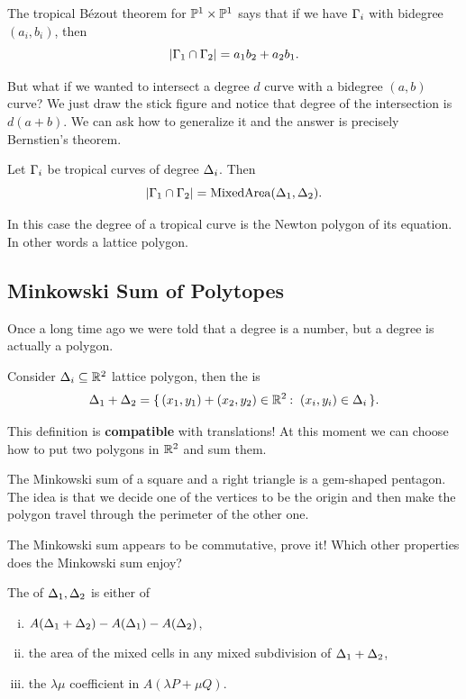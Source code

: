 \documentclass[12pt]{memoir}
\theoremstyle{definition}
\def\la{\lambda}
\begin{document}
The tropical Bézout theorem for $\mathbb{P}^1\times\mathbb{P}^1$ says that if we have $\Gamma_i$ with bidegree $(a_i,b_i)$, then 
$$|\Gamma_1\cap\Gamma_2|=a_1b_2+a_2b_1.$$

But what if we wanted to intersect a degree $d$ curve with a bidegree $(a,b)$ curve? We just draw the stick figure and notice that degree of the intersection is $d(a+b)$. We can ask how to generalize it and the answer is precisely Bernstien's theorem.

\begin{Th}
Let $\Gamma_i$ be tropical curves of degree $\Delta_i$. Then 
$$|\Gamma_1\cap\Gamma_2|=\operatorname{MixedArea}(\Delta_1,\Delta_2).$$
\end{Th}

In this case the degree of a tropical curve is the Newton polygon of its equation. In other words a lattice polygon.

\subsection{Minkowski Sum of Polytopes}

Once a long time ago we were told that a degree is a number, but a degree is actually a polygon.
\begin{Def}
    Consider $\Delta_i\subseteq\mathbb{R}^2$ lattice polygon, then the  is 
    $$\Dl_1+\Dl_2=\set{(x_1,y_1)+(x_2,y_2)\in\bR^2\:\ (x_i,y_i)\in\Dl_i}.$$
\end{Def}
This definition is \textbf{compatible} with translations! At this moment we can choose how to put two polygons in $\mathbb{R}^2$ and sum them. 

\begin{Ex}
    The Minkowski sum of a square and a right triangle is a gem-shaped pentagon. The idea is that we decide one of the vertices to be the origin and then make the polygon travel through the perimeter of the other one.
\end{Ex}

\begin{Ej}
The Minkowski sum appears to be commutative, prove it! Which other properties does the Minkowski sum enjoy?
\end{Ej}

\begin{Ex}
\end{Ex}

\begin{Def}
    The  of $\Delta_1,\Delta_2$ is either of 
    \begin{enumerate}[i)]
        \item $A(\Delta_1+\Delta_2)-A(\Delta_1)-A(\Delta_2)$,
        \item the area of the mixed cells in any mixed subdivision of $\Delta_1+\Delta_2$,
        \item the $\la\mu$ coefficient in $A(\la P+\mu Q)$.
    \end{enumerate}
\end{Def}
\end{document}
